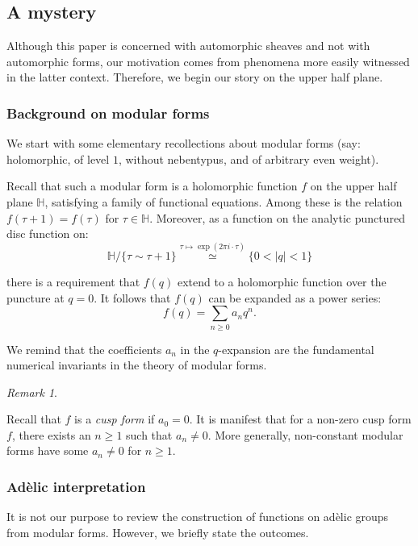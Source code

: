 \documentclass[reqno,11pt]{amsart}
\numberwithin{equation}{subsection}
\theoremstyle{remark}
\newtheorem{rem}[thm]{Remark}
\newcommand{\bH}{{\mathbb H}}
\begin{document}
\subsection{A mystery}

Although this paper is concerned with automorphic sheaves and not
with automorphic forms, 
our motivation comes from phenomena more easily witnessed in the latter context.
Therefore, we begin our story on the upper half plane.

\subsubsection{Background on modular forms}\label{sss:modular}

We start with some elementary recollections about modular forms
(say: holomorphic, of level $1$, without nebentypus, and of arbitrary even weight).

Recall that such a modular form is a holomorphic function $f$
on the upper half plane $\bH$, satisfying a family of functional equations.
Among these is the relation $f(\tau+1) = f(\tau)$ for $\tau \in \bH$. 
Moreover, as a function on the analytic punctured disc
function on: 
%
\[
\bH/\{\tau \sim \tau+1\} \overset{\tau \mapsto \exp(2\pi i \cdot \tau)}{\simeq} \{0<|q|<1\}
\]

\noindent there is a requirement that $f(q)$ extend to a holomorphic 
function over the puncture at $q = 0$.
It follows that $f(q)$ can be expanded as a power series:
%
\[
f(q) = \underset{n\geq 0}{\sum} a_n q^n.
\]

\noindent We remind that the coefficients $a_n$ in the $q$-expansion are the fundamental 
numerical invariants in the theory of modular forms.

\begin{rem}\label{r:cusp-fm}

Recall that $f$ is a \emph{cusp form} if $a_0 = 0$. 
It is manifest that for a non-zero cusp form $f$, there exists 
an $n \geq 1$ such that $a_n \neq 0$. More generally, non-constant
modular forms have some $a_n \neq 0$ for $n \geq 1$.

\end{rem}

\subsubsection{Ad\`elic interpretation}

It is not our purpose to review the construction of functions on 
ad\`elic groups from modular forms. However, we briefly state 
the outcomes.
\end{document}
